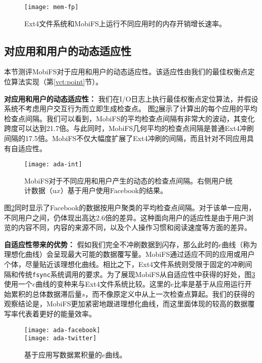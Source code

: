 \begin{figure}[!ht]
  \centering
  \texttt{[image: mem-fp]}
  \caption{Ext4文件系统和MobiFS上运行不同应用时的内存开销增长速率。}
  \label{fig:mem-fp}
\end{figure}

\subsection{对应用和用户的动态适应性} \label{vct:eval-ada}

本节测评MobiFS对于应用和用户的动态适应性。该适应性由我们的最佳权衡点定位算法实现（第\ref{vct:point}节）。

\noindent\textbf{对应用和用户的动态适应性：}
我们在I/O日志上执行最佳权衡点定位算法，并假设系统不考虑用户交互行为而立即生成检查点。
图\ref{fig:ada-int}展示了计算出的每个应用的平均检查点间隔。我们可以看到，MobiFS的平均检查点间隔有非常大的波动，其变化跨度可以达到21.7倍。与此同时，MobiFS几何平均的检查点间隔是普通Ext4冲刷间隔的17.5倍。MobiFS不仅大幅度扩展了Ext4冲刷的间隔，而且针对不同应用具有自适应性。

\begin{figure}[!ht]
  \centering
  \texttt{[image: ada-int]}
  \caption{MobiFS对于不同应用和用户产生的动态的检查点间隔。右侧用户统计数据（u$x$）基于用户使用Facebook的结果。}
  \label{fig:ada-int}
\end{figure}

图\ref{fig:ada-int}同时显示了Facebook的数据按用户聚类的平均检查点间隔。对于该单一应用，不同用户之间，仍体现出高达2.6倍的差异。这种面向用户的适应性是由于用户浏览的内容不同，内容的来源不同，以及个人操作习惯和阅读速度等方面的差异。

\noindent\textbf{自适应性带来的优势：}
假如我们完全不冲刷数据到闪存，那么此时的$e$曲线（称为理想化曲线）会呈现最大可能的数据覆写量。MobiFS通过适应不同的应用或用户个体，尽量贴近该理想化曲线。相比之下，Ext4文件系统则受限于固定的冲刷间隔和传统\texttt{fsync}系统调用的要求。为了展现MobiFS从自适应性中获得的好处，图\ref{fig:spa-ada}使用一个$e$曲线的变种来与Ext4文件系统比较。这里的$e$比率是基于从应用运行开始累积的总体数据滞后量$s$，而不像原定义中从上一次检查点算起。我们的获得的观察结论是，MobiFS更加紧密地跟进理想化曲线，而这里面体现的较高的数据覆写率代表着更好的能量效率。

\begin{figure}[!ht]
\centering
\texttt{[image: ada-facebook]}\\
\vspace{10pt}
\texttt{[image: ada-twitter]}\\
\caption{基于应用写数据累积量的$e$曲线。}
\label{fig:spa-ada}
\end{figure}

